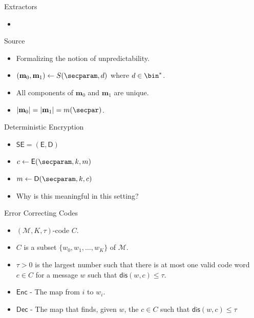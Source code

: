 \documentclass{beamer}
\newcommand{\msgspc}{\mathcal{M}}
\newcommand{\smzero}{\textbf{m}_0}
\newcommand{\smone}{\textbf{m}_1}
\begin{document}
\begin{frame}{Extractors}
	\begin{itemize}
		\setlength\itemsep{1em}
		\item 
	\end{itemize}
\end{frame}

\begin{frame}{Source}
	\begin{itemize}
		\setlength\itemsep{1em}
		\item Formalizing the notion of unpredictability.
		\item $(\smzero, \smone) \leftarrow S(\secparam, d)$ where $d \in \bin^*$.
		\item All components of $\smzero$ and $\smone$ are unique.
		\item $|\smzero| = |\smone|= m(\secpar)$.
	\end{itemize}
\end{frame}

\begin{frame}{Deterministic Encryption}
	\begin{itemize}
		\setlength\itemsep{1em}
		\item $\mathsf{SE=(E, D)}$
		\item $c \leftarrow \mathsf{E}(\secparam, k, m)$
		\item $m \leftarrow \mathsf{D}(\secparam, k, c)$
		\item Why is this meaningful in this setting?
	\end{itemize}
\end{frame}

\begin{frame}{Error Correcting Codes}
	\begin{itemize}
		\setlength\itemsep{1em}
		\item $(\msgspc, K, \tau)$-code $C$.
		\item $C$ is a subset $\{w_0, w_1, \ldots, w_K \}$ of $\msgspc$.
		\item $\tau > 0$ is the largest number such that there is at most one valid code word $c \in C$ for a message $w$ such that $\mathsf{dis}(w,c) \leq \tau$.
		\item $\mathsf{Enc}$ - The map from $i$ to $w_i$.
		\item $\mathsf{Dec}$ - The map that finds, given $w$, the $c \in C$ such that $\mathsf{dis}(w,c) \leq \tau$\
		
	\end{itemize}
\end{frame}
\end{document}
